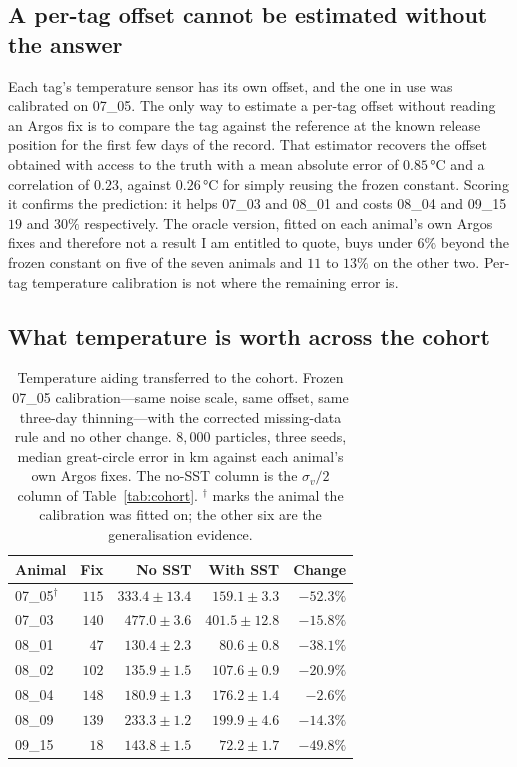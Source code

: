 \documentclass[conference]{IEEEtran}
\begin{document}
\subsection{A per-tag offset cannot be estimated without the answer}

Each tag's temperature sensor has its own offset, and the one in use was
calibrated on 07\_05. The only way to estimate a per-tag offset without reading
an Argos fix is to compare the tag against the reference at the known release
position for the first few days of the record. That estimator recovers the
offset obtained with access to the truth with a mean absolute error of
$0.85$\,\si{\celsius} and a correlation of $0.23$, against
$0.26$\,\si{\celsius} for simply reusing the frozen constant. Scoring it
confirms the prediction: it helps 07\_03 and 08\_01 and costs 08\_04 and 09\_15
$19$ and $30\%$ respectively. The oracle version, fitted on each animal's own
Argos fixes and therefore not a result I am entitled to quote, buys under
$6\%$ beyond the frozen constant on five of the seven animals and $11$ to
$13\%$ on the other two. Per-tag temperature calibration is not where the
remaining error is.

\subsection{What temperature is worth across the cohort}

\begin{table}[t]
\caption{Temperature aiding transferred to the cohort. Frozen 07\_05
calibration---same noise scale, same offset, same three-day thinning---with the
corrected missing-data rule and no other change. $8{,}000$ particles, three
seeds, median great-circle error in \si{\km} against each animal's own Argos
fixes. The no-SST column is the $\sigma_v/2$ column of
Table~\ref{tab:cohort}. $^{\dagger}$ marks the animal the calibration was
fitted on; the other six are the generalisation evidence.}
\label{tab:sstcohort}
\centering
\small
\begin{tabular}{@{}lrrrr@{}}
\toprule
Animal & Fix & No SST & With SST & Change \\
\midrule
07\_05$^{\dagger}$ & $115$ & $333.4 \pm 13.4$ & $159.1 \pm 3.3$  & $-52.3\%$ \\
07\_03             & $140$ & $477.0 \pm 3.6$  & $401.5 \pm 12.8$ & $-15.8\%$ \\
08\_01             & $47$  & $130.4 \pm 2.3$  & $80.6 \pm 0.8$   & $-38.1\%$ \\
08\_02             & $102$ & $135.9 \pm 1.5$  & $107.6 \pm 0.9$  & $-20.9\%$ \\
08\_04             & $148$ & $180.9 \pm 1.3$  & $176.2 \pm 1.4$  & $-2.6\%$ \\
08\_09             & $139$ & $233.3 \pm 1.2$  & $199.9 \pm 4.6$  & $-14.3\%$ \\
09\_15             & $18$  & $143.8 \pm 1.5$  & $72.2 \pm 1.7$   & $-49.8\%$ \\
\bottomrule
\end{tabular}
\end{table}
\end{document}

